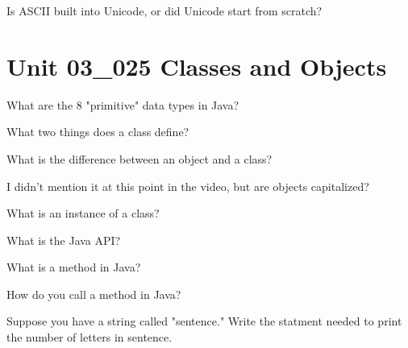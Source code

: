 \documentclass[letterpaper,12pt]{exam}
\newcommand{\unit}{Unit 03}
\begin{document}
\begin{questions}
\begin{samepage}
	\question Is ASCII built into Unicode, or did Unicode start from scratch?
	\vspace{5mm}
\end{samepage}
\section*{\unit\_025 Classes and Objects} %
\begin{samepage}
	\question What are the 8 "primitive" data types in Java?
	\vspace{5mm}
\end{samepage}
\begin{samepage}
	\question What two things does a class define?
	\vspace{5mm}
\end{samepage}
\begin{samepage}
	\question What is the difference between an object and a class?
	\vspace{5mm}
\end{samepage}
\begin{samepage}
	\question I didn't mention it at this point in the video, but are objects capitalized?
	\vspace{5mm}
\end{samepage}


\begin{samepage}
	\question What is an instance of a class?
	\vspace{5mm}
\end{samepage}

\begin{samepage}
	\question What is the Java API?
	\vspace{5mm}
\end{samepage}

\begin{samepage}
	\question What is a method in Java?
	\vspace{5mm}
\end{samepage}

\begin{samepage}
	\question How do you call a method in Java?
	\vspace{5mm}
\end{samepage}

\begin{samepage}
	\question Suppose you have a string called "sentence."  Write the statment needed to print the number of letters in sentence.
	\vspace{5mm}
\end{samepage}


\end{questions}
\end{document}
